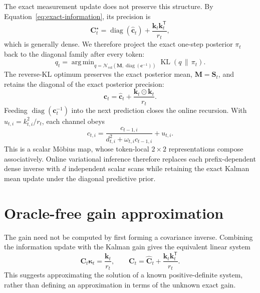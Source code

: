 \documentclass[11pt]{article}
\newcommand{\vct}[1]{\boldsymbol{#1}}
\newcommand{\tr}{\mathsf{T}}
\DeclareMathOperator{\diag}{diag}
\DeclareMathOperator*{\argmin}{arg\,min}
\begin{document}
The exact measurement update does not preserve this structure.  By
Equation~\eqref{eq:exact-information}, its precision is
\begin{equation}
  \vct{C}_t^\star
  =\diag(\widehat{\vct{c}}_t)
   +\frac{\vct{k}_t\vct{k}_t^{\tr}}{r_t},
  \label{eq:exact-dense-posterior-information}
\end{equation}
which is generally dense.  We therefore project the exact one-step posterior
$\pi_t$ back to the diagonal family after every token:
\begin{equation}
  q_t
  =\argmin_{q=\mathcal N_{\mathrm{col}}
    (\vct{M},\diag(\vct{c}^{-1}))}
    \operatorname{KL}(q\,\|\,\pi_t).
  \label{eq:online-diagonal-vi}
\end{equation}
The reverse-KL optimum preserves the exact posterior mean,
$\vct{M}=\vct{S}_t$, and retains the diagonal of the exact posterior
precision:
\begin{equation}
  \boxed{
  \vct{c}_t
  =\widehat{\vct{c}}_t
   +\frac{\vct{k}_t\odot\vct{k}_t}{r_t}.}
  \label{eq:diagonal-vi-information}
\end{equation}
Feeding $\diag(\vct{c}_t^{-1})$ into the next prediction closes the online
recursion.  With $u_{t,i}=k_{t,i}^2/r_t$, each channel obeys
\begin{equation}
  c_{t,i}
  =\frac{c_{t-1,i}}
  {d_{t,i}^2+\omega_{t,i}c_{t-1,i}}+u_{t,i}.
  \label{eq:diagonal-mobius}
\end{equation}
This is a scalar M\"obius map, whose token-local $2\times2$ representations
compose associatively.  Online variational inference therefore replaces each
prefix-dependent dense inverse with $d$ independent scalar scans while
retaining the exact Kalman mean update under the diagonal predictive prior.

\section{Oracle-free gain approximation}

The gain need not be computed by first forming a covariance inverse.  Combining
the information update with the Kalman gain gives the equivalent linear system
\begin{equation}
  \boxed{
  \vct{C}_t\vct{\kappa}_t=\frac{\vct{k}_t}{r_t},
  \qquad
  \vct{C}_t
  =\widehat{\vct{C}}_t
   +\frac{\vct{k}_t\vct{k}_t^{\tr}}{r_t}.}
  \label{eq:gain-linear-system}
\end{equation}
This suggests approximating the solution of a known positive-definite system,
rather than defining an approximation in terms of the unknown exact gain.
\end{document}
